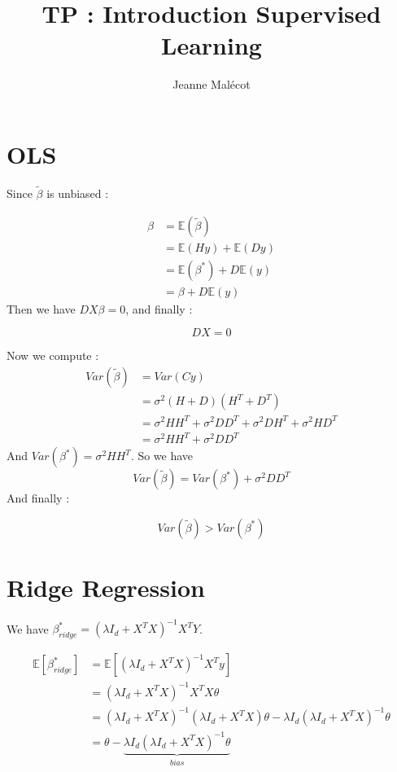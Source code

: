 \documentclass[12pt,a4paper]{article}
\title{TP : Introduction Supervised Learning}
\author{Jeanne Malécot}
\date{}
\begin{document}
\maketitle

\section{OLS}
Since $\tilde{\beta}$ is unbiased : 

\begin{align} 
    \beta & =\mathbb{E}(\tilde{\beta})              \\
          & = \mathbb{E}(Hy) + \mathbb{E}(Dy)       \\  
          & = \mathbb{E}(\beta ^*) + D\mathbb{E}(y) \\
          & = \beta  + D\mathbb{E}(y)
\end{align}
Then we have $DX\beta = 0$, and finally :

$$ 
    \boxed{DX = 0}
$$

Now we compute :
\begin{align} 
    Var(\tilde{\beta}) & = Var(Cy)                                                  \\
                       & = \sigma^2(H+D)(H^T+D^T)                                   \\  
                       & = \sigma^2HH^T + \sigma^2DD^T + \sigma^2DH^T +\sigma^2HD^T \\
                       & = \sigma^2HH^T + \sigma^2DD^T 
\end{align}
And $ Var(\beta^*) = \sigma^2 HH^T $.   
So we have
$$
    Var(\tilde{\beta}) = Var(\beta^*) + \sigma^2DD^T    
$$
And finally : 

$$
    \boxed{Var(\tilde{\beta}) > Var(\beta^*) }
$$

\section{Ridge Regression}

We have $\beta^*_{ridge} = (\lambda I_d + X^TX)^{-1}X^TY$. 

\begin{align} 
    \mathbb{E}[\beta^*_{ridge}] & = \mathbb{E}[(\lambda I_d + X^TX)^{-1}X^Ty]                                                        \\
                                & = (\lambda I_d + X^TX)^{-1}X^TX\theta                                                              \\ 
                                & = (\lambda I_d + X^TX)^{-1}(\lambda I_d + X^TX)\theta - \lambda I_d(\lambda I_d + X^TX)^{-1}\theta \\
                                & = \theta - \underbrace{\lambda I_d(\lambda I_d + X^TX)^{-1}\theta}_{bias}
\end{align}
\end{document}
